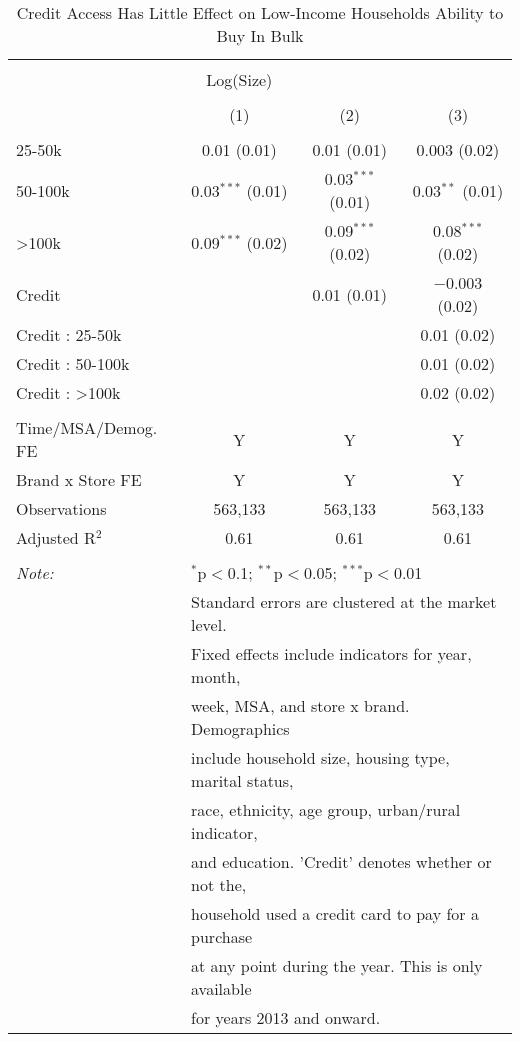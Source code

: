 
\begin{table}[!htbp] \centering 
  \caption{Credit Access Has Little Effect on Low-Income Households Ability to Buy In Bulk} 
  \label{tab:packageSizeFullTpLiq} 
\begin{tabular}{@{\extracolsep{5pt}}lccc} 
\\[-1.8ex]\hline 
\hline \\[-1.8ex] 
 & Log(Size) &  &  \\ 
\\[-1.8ex] & (1) & (2) & (3)\\ 
\hline \\[-1.8ex] 
 25-50k & 0.01 (0.01) & 0.01 (0.01) & 0.003 (0.02) \\ 
  50-100k & 0.03$^{***}$ (0.01) & 0.03$^{***}$ (0.01) & 0.03$^{**}$ (0.01) \\ 
  >100k & 0.09$^{***}$ (0.02) & 0.09$^{***}$ (0.02) & 0.08$^{***}$ (0.02) \\ 
  Credit &  & 0.01 (0.01) & $-$0.003 (0.02) \\ 
  Credit : 25-50k &  &  & 0.01 (0.02) \\ 
  Credit : 50-100k &  &  & 0.01 (0.02) \\ 
  Credit : >100k &  &  & 0.02 (0.02) \\ 
 \hline \\[-1.8ex] 
Time/MSA/Demog. FE & Y & Y & Y \\ 
Brand x Store FE & Y & Y & Y \\ 
Observations & 563,133 & 563,133 & 563,133 \\ 
Adjusted R$^{2}$ & 0.61 & 0.61 & 0.61 \\ 
\hline 
\hline \\[-1.8ex] 
\textit{Note:}  & \multicolumn{3}{l}{$^{*}$p$<$0.1; $^{**}$p$<$0.05; $^{***}$p$<$0.01} \\ 
 & \multicolumn{3}{l}{Standard errors are clustered at the market level.} \\ 
 & \multicolumn{3}{l}{Fixed effects include indicators for year, month, } \\ 
 & \multicolumn{3}{l}{week, MSA, and store x brand. Demographics } \\ 
 & \multicolumn{3}{l}{include household size, housing type, marital status, } \\ 
 & \multicolumn{3}{l}{race, ethnicity, age group, urban/rural indicator, } \\ 
 & \multicolumn{3}{l}{and education. 'Credit' denotes whether or not the,} \\ 
 & \multicolumn{3}{l}{household used a credit card to pay for a purchase } \\ 
 & \multicolumn{3}{l}{at any point during the year. This is only available } \\ 
 & \multicolumn{3}{l}{for years 2013 and onward.} \\ 
\end{tabular} 
\end{table} 
